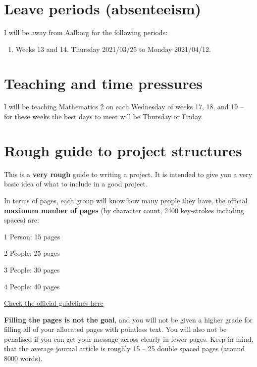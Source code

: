 \documentclass[
]{book}
\providecommand{\tightlist}{%
  \setlength{\itemsep}{0pt}\setlength{\parskip}{0pt}}
\begin{document}
\hypertarget{leave-periods-absenteeism}{%
\section{Leave periods (absenteeism)}\label{leave-periods-absenteeism}}

I will be away from Aalborg for the following periods:

\begin{enumerate}
\def\labelenumi{\arabic{enumi}.}
\tightlist
\item
  Weeks 13 and 14. Thursday 2021/03/25 to Monday 2021/04/12.
\end{enumerate}

\hypertarget{teaching-and-time-pressures}{%
\section{Teaching and time pressures}\label{teaching-and-time-pressures}}

I will be teaching Mathematics 2 on each Wednesday of weeks 17, 18, and
19 -- for these weeks the best days to meet will be Thursday or Friday.

\hypertarget{rough-guide-to-project-structures}{%
\section{Rough guide to project structures}\label{rough-guide-to-project-structures}}

This is a \textbf{very rough} guide to writing a project. It is intended to
give you a very basic idea of what to include in a good project.

In terms of pages, each group will know how many people they have, the
official \textbf{maximum number of pages} (by character count, 2400
key-strokes including spaces) are:

1 Person: 15 pages

2 People: 25 pages

3 People: 30 pages

4 People: 40 pages

\href{https://www.business.aau.dk/education/students}{Check the official guidelines here}

\textbf{Filling the pages is not the goal}, and you will not be given a
higher grade for filling all of your allocated pages with pointless
text. You will also not be penalised if you can get your message across
clearly in fewer pages. Keep in mind, that the average journal article
is roughly 15 -- 25 double spaced pages (around 8000 words).
\end{document}

